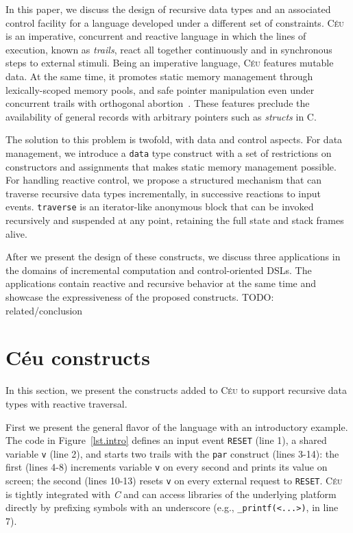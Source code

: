 \documentclass{sig-alternate}
\newcommand{\CEU}{\textsc{C\'{e}u}\xspace}
\newcommand{\code}[1] {{\small{\texttt{#1}}}}
\begin{document}
In this paper, we discuss the design of recursive data types and an associated
control facility for a language developed under a different set of
constraints. \CEU~\cite{ceu.sensys13,ceu.mod15} is an imperative, concurrent and
reactive language in which the lines of execution, known as \emph{trails},
react all together continuously and in synchronous steps to external stimuli.
Being an imperative language, \CEU features mutable data.
At the same time, it promotes static memory management through lexically-scoped
memory pools, and safe pointer manipulation even under concurrent trails with 
orthogonal abortion~\cite{ceu.mod15}.
These features preclude the availability of general records with arbitrary 
pointers such as \emph{structs} in C.

The solution to this problem is twofold, with data and control aspects.
For data management, we introduce a \code{data} type construct with a set of 
restrictions on constructors and assignments that makes static memory 
management possible.
For handling reactive control, we propose a structured mechanism that can 
traverse recursive data types incrementally, in successive reactions to input 
events.
\code{traverse} is an iterator-like anonymous block that can be invoked 
recursively and suspended at any point, retaining the full state and stack 
frames alive.

After we present the design of these constructs, we discuss three applications 
in the domains of incremental computation and control-oriented DSLs.
The applications contain reactive and recursive behavior at the same time and 
showcase the expressiveness of the proposed constructs.
TODO: related/conclusion

\section{C\'eu constructs}

In this section, we present the constructs added to \CEU to support recursive
data types with reactive traversal.

First we present the general flavor of the language with an introductory 
example.
The code in Figure~\ref{lst.intro} defines an input event \code{RESET} (line 
1), a shared variable \code{v} (line 2), and starts two trails with the 
\code{par} construct (lines 3-14): the first (lines 4-8) increments variable 
\code{v} on every second and prints its value on screen; the second (lines 
10-13) resets \code{v} on every external request to \code{RESET}.
\CEU is tightly integrated with \emph{C} and can access libraries of the 
underlying platform directly by prefixing symbols with an underscore (e.g., 
\code{\_printf(<...>)}, in line 7).
\end{document}
